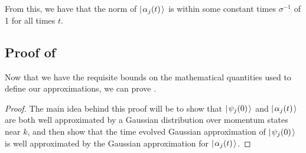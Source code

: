\documentclass[../thesis-main/thesis-main]{subfiles}
\begin{document}
From this, we have that the norm of 	$|\mspace{2mu} \alpha_j(t) \mspace{2mu} \rangle$ is within some constant times $\sigma^{-1}$ of 1 for all times $t$.


\subsection{Proof of }

Now that we have the requisite bounds on the mathematical quantities used to define our approximations, we can prove .


\begin{proof}



The main idea behind this proof will be to show that $|\mspace{2mu} \psi_j(0) \mspace{2mu} \rangle$ and $|\mspace{2mu} \alpha_j(t) \mspace{2mu} \rangle$ are both well approximated by a Gaussian distribution over momentum states near $k$, and then show that the time evolved Gaussian approximation of $|\mspace{2mu} \psi_j(0) \mspace{2mu} \rangle$ is well approximated by the Gaussian approximation for $|\mspace{2mu} \alpha_j(t) \mspace{2mu} \rangle$.  


\end{proof}
\end{document}
